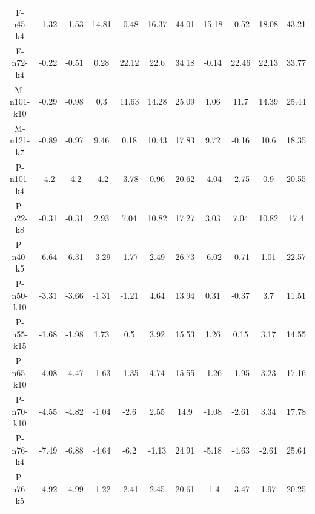 \documentclass[11pt]{article} %
\begin{document}
\begin{enumerate}
\begin{landscape}
\begin{table}[p]
\begin{small}
\begin{tabular}{ccccccccccc}
F-n45-k4&-1.32&-1.53&14.81&-0.48&16.37&44.01&15.18&-0.52&18.08&43.21 \\
F-n72-k4&-0.22&-0.51&0.28&22.12&22.6&34.18&-0.14&22.46&22.13&33.77 \\
M-n101-k10&-0.29&-0.98&0.3&11.63&14.28&25.09&1.06&11.7&14.39&25.44 \\ 
M-n121-k7&-0.89&-0.97&9.46&0.18&10.43&17.83&9.72&-0.16&10.6&18.35 \\
P-n101-k4&-4.2&-4.2&-4.2&-3.78&0.96&20.62&-4.04&-2.75&0.9&20.55 \\
P-n22-k8&-0.31&-0.31&2.93&7.04&10.82&17.27&3.03&7.04&10.82&17.4 \\
P-n40-k5&-6.64&-6.31&-3.29&-1.77&2.49&26.73&-6.02&-0.71&1.01&22.57 \\
P-n50-k10&-3.31&-3.66&-1.31&-1.21&4.64&13.94&0.31&-0.37&3.7&11.51 \\
P-n55-k15&-1.68&-1.98&1.73&0.5&3.92&15.53&1.26&0.15&3.17&14.55 \\
P-n65-k10&-4.08&-4.47&-1.63&-1.35&4.74&15.55&-1.26&-1.95&3.23&17.16 \\
P-n70-k10&-4.55&-4.82&-1.04&-2.6&2.55&14.9&-1.08&-2.61&3.34&17.78 \\
P-n76-k4&-7.49&-6.88&-4.64&-6.2&-1.13&24.91&-5.18&-4.63&-2.61&25.64 \\
P-n76-k5&-4.92&-4.99&-1.22&-2.41&2.45&20.61&-1.4&-3.47&1.97&20.25 \\
\bottomrule
\end{tabular}
\end{small}
\end{table}%


\end{landscape}
\end{enumerate}
\end{document}

